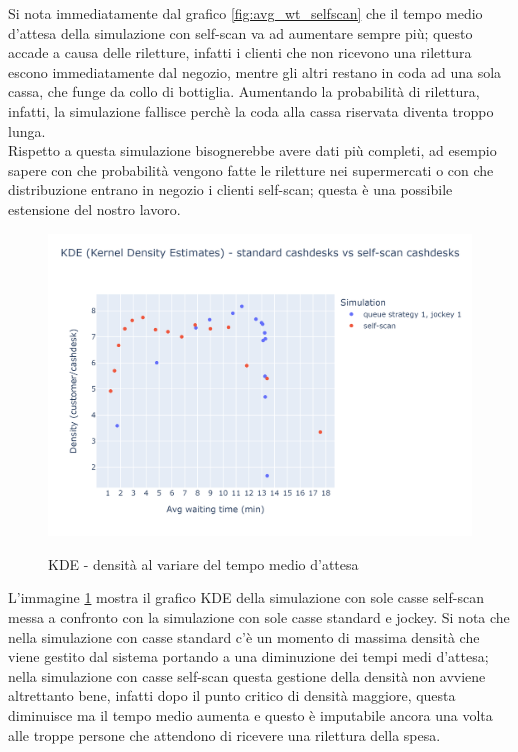 Si nota immediatamente dal grafico \ref{fig:avg_wt_selfscan} che il tempo medio d'attesa della simulazione con self-scan va ad aumentare sempre più; questo accade a causa delle riletture, infatti i clienti che non ricevono una rilettura escono immediatamente dal negozio, mentre gli altri restano in coda ad una sola cassa, che funge da collo di bottiglia. Aumentando la probabilità di rilettura, infatti, la simulazione fallisce perchè la coda alla cassa riservata diventa troppo lunga. \\
Rispetto a questa simulazione bisognerebbe avere dati più completi, ad esempio sapere con che probabilità vengono fatte le riletture nei supermercati o con che distribuzione entrano in negozio i clienti self-scan; questa è una possibile estensione del nostro lavoro.

\begin{figure}[H]
	\centering
	\includegraphics[width=12cm]{"images/results/kde_self_scan.png"}
	\label{fig:kde_self_scan}
	\caption{KDE - densità al variare del tempo medio d'attesa}
\end{figure}

L'immagine \ref{fig:kde_self_scan} mostra il grafico KDE della simulazione con sole casse self-scan messa a confronto con la simulazione con sole casse standard e jockey. Si nota che nella simulazione con casse standard c'è un momento di massima densità che viene gestito dal sistema portando a una diminuzione dei tempi medi d'attesa; nella simulazione con casse self-scan questa gestione della densità non avviene altrettanto bene, infatti dopo il punto critico di densità maggiore, questa diminuisce ma il tempo medio aumenta e questo è imputabile ancora una volta alle troppe persone che attendono di ricevere una rilettura della spesa.

